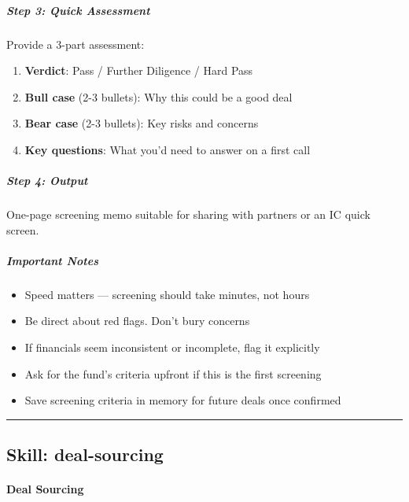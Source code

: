 \documentclass[11pt]{article}
\begin{document}
\subparagraph{Step 3: Quick Assessment}\mbox{}\par

Provide a 3-part assessment:


\begin{enumerate}[leftmargin=*,itemsep=2pt,topsep=2pt]
\item {} \textbf{Verdict}: Pass / Further Diligence / Hard Pass
\item {} \textbf{Bull case} (2-3 bullets): Why this could be a good deal
\item {} \textbf{Bear case} (2-3 bullets): Key risks and concerns
\item {} \textbf{Key questions}: What you'd need to answer on a first call
\end{enumerate}

\subparagraph{Step 4: Output}\mbox{}\par

One-page screening memo suitable for sharing with partners or an IC quick screen.


\subparagraph{Important Notes}\mbox{}\par

\begin{itemize}[leftmargin=*,itemsep=2pt,topsep=2pt]
\item {} Speed matters — screening should take minutes, not hours
\item {} Be direct about red flags. Don't bury concerns
\item {} If financials seem inconsistent or incomplete, flag it explicitly
\item {} Ask for the fund's criteria upfront if this is the first screening
\item {} Save screening criteria in memory for future deals once confirmed
\end{itemize}

\vspace{0.8em}\hrule\vspace{0.8em}

\subsection{Skill: deal-sourcing}\label{file:skills-deal-sourcing-SKILL.md}

\paragraph{Deal Sourcing}\mbox{}\par
\end{document}
